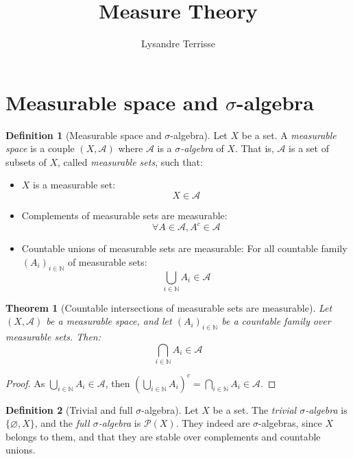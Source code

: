 \documentclass{article}
\title{Measure Theory}
\author{Lysandre Terrisse}
\newtheorem{theorem}{Theorem}[section]
\theoremstyle{definition}
\newtheorem{definition}{Definition}[section]
\theoremstyle{remark}
\theoremstyle{example}
\begin{document}
\maketitle


\section{Measurable space and $\sigma$-algebra}

\begin{definition}[Measurable space and $\sigma$-algebra]
    Let $X$ be a set. A \textit{measurable space} is a couple $(X, \mathcal{A})$ where $\mathcal{A}$ is a \textit{$\sigma$-algebra} of $X$. That is, $\mathcal{A}$ is a set of subsets of $X$, called \textit{measurable sets}, such that:
    \begin{itemize}
        \item $X$ is a measurable set:
            $$X \in \mathcal{A}$$
        \item Complements of measurable sets are measurable:
            $$\forall A \in \mathcal{A}, A^c \in \mathcal{A}$$
        \item Countable unions of measurable sets are measurable: For all countable family $(A_i)_{i \in \mathbb{N}}$ of measurable sets:
            $$\bigcup_{i \in \mathbb{N}} A_i \in \mathcal{A}$$
    \end{itemize}
\end{definition}

\begin{theorem}[Countable intersections of measurable sets are measurable]
    Let $(X, \mathcal{A})$ be a measurable space, and let $(A_i)_{i \in \mathbb{N}}$ be a countable family over measurable sets. Then:
            $$\bigcap_{i \in \mathbb{N}} A_i \in \mathcal{A}$$
\end{theorem}

\begin{proof}
    As $\bigcup_{i \in \mathbb{N}} A_i \in \mathcal{A}$, then $\left(\bigcup_{i \in \mathbb{N}} A_i\right)^c = \bigcap_{i \in \mathbb{N}} A_i \in \mathcal{A}$.
\end{proof}

\begin{definition}[Trivial and full $\sigma$-algebra]
    Let $X$ be a set. The \textit{trivial $\sigma$-algebra} is $\{\varnothing, X\}$, and the \textit{full $\sigma$-algebra} is $\mathcal{P}(X)$. They indeed are $\sigma$-algebras, since $X$ belongs to them, and that they are stable over complements and countable unions.
\end{definition}
\end{document}
